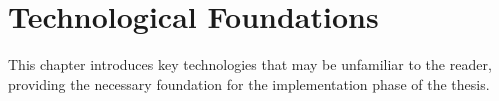 \chapter{Technological Foundations}
\label{chap:{TechnologicalFoundations}}
This chapter introduces key technologies that may be unfamiliar to the reader, providing the necessary foundation for the implementation phase of the thesis.


